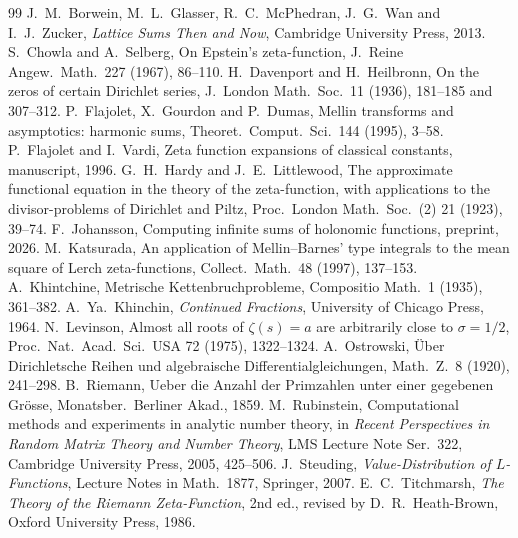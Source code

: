 \documentclass[11pt,reqno]{amsart}
\theoremstyle{definition}
\theoremstyle{remark}
\begin{document}
\begin{thebibliography}{99}
 J.~M.~Borwein, M.~L.~Glasser, R.~C.~McPhedran, J.~G.~Wan and I.~J.~Zucker, \emph{Lattice Sums Then and Now}, Cambridge University Press, 2013.
 S.~Chowla and A.~Selberg, On Epstein's zeta-function, J.\ Reine Angew.\ Math.\ 227 (1967), 86--110.
 H.~Davenport and H.~Heilbronn, On the zeros of certain Dirichlet series, J.\ London Math.\ Soc.\ 11 (1936), 181--185 and 307--312.
 P.~Flajolet, X.~Gourdon and P.~Dumas, Mellin transforms and asymptotics: harmonic sums, Theoret.\ Comput.\ Sci.\ 144 (1995), 3--58.
 P.~Flajolet and I.~Vardi, Zeta function expansions of classical constants, manuscript, 1996.
 G.~H.~Hardy and J.~E.~Littlewood, The approximate functional equation in the theory of the zeta-function, with applications to the divisor-problems of Dirichlet and Piltz, Proc.\ London Math.\ Soc.\ (2) 21 (1923), 39--74.
 F.~Johansson, Computing infinite sums of holonomic functions, preprint, 2026.
 M.~Katsurada, An application of Mellin--Barnes' type integrals to the mean square of Lerch zeta-functions, Collect.\ Math.\ 48 (1997), 137--153.
 A.~Khintchine, Metrische Kettenbruchprobleme, Compositio Math.\ 1 (1935), 361--382.
 A.~Ya.~Khinchin, \emph{Continued Fractions}, University of Chicago Press, 1964.
 N.~Levinson, Almost all roots of $\zeta(s) = a$ are arbitrarily close to $\sigma = 1/2$, Proc.\ Nat.\ Acad.\ Sci.\ USA 72 (1975), 1322--1324.
 A.~Ostrowski, \"Uber Dirichletsche Reihen und algebraische Differentialgleichungen, Math.\ Z.\ 8 (1920), 241--298.
 B.~Riemann, Ueber die Anzahl der Primzahlen unter einer gegebenen Gr\"osse, Monatsber.\ Berliner Akad., 1859.
 M.~Rubinstein, Computational methods and experiments in analytic number theory, in \emph{Recent Perspectives in Random Matrix Theory and Number Theory}, LMS Lecture Note Ser.\ 322, Cambridge University Press, 2005, 425--506.
 J.~Steuding, \emph{Value-Distribution of $L$-Functions}, Lecture Notes in Math.\ 1877, Springer, 2007.
 E.~C.~Titchmarsh, \emph{The Theory of the Riemann Zeta-Function}, 2nd ed., revised by D.~R.~Heath-Brown, Oxford University Press, 1986.
\end{thebibliography}
\end{document}
